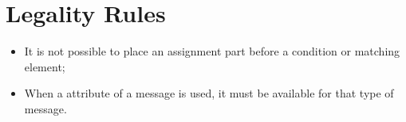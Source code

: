 \section*{Legality Rules}
\begin{itemize}[noitemsep]
\item It is not possible to place an assignment part before a condition or matching element;
\item When a attribute of a message is used, it must be available for that type of message.
\end{itemize}

\comments{}
